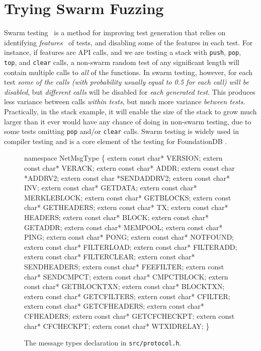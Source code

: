 \section{Trying Swarm Fuzzing}

Swarm testing~\cite{ISSTA12} is a method for improving test
generation that relies on identifying \emph{features}~\cite{groce2013help} of tests, and
disabling some of the features in each test.  For instance, if features are
API calls, and we are testing a stack with {\tt push}, {\tt pop}, {\tt
  top}, and {\tt clear} calls, a non-swarm random test of any
significant length will contain multiple calls to \emph{all} of
the functions.  In swarm testing, however, for each test \emph{some of the calls
(with probability usually equal to 0.5 for each call) will be
disabled}, but \emph{different calls} will be disabled for \emph{each generated
test}.  This produces less variance between calls \emph{within tests}, but
much more variance \emph{between tests}.  Practically, in the stack
example, it will enable the size of the stack to grow much larger than
it ever would have any chance of doing in non-swarm testing, due to
some tests omitting {\tt pop} and/or {\tt clear} calls.  Swarm testing
is widely used in compiler testing
\cite{le2014compiler} and is a core element of the
testing for FoundationDB \cite{zhou2021foundationdb}.

\begin{figure}
{\scriptsize
\begin{code}
namespace NetMsgType \{
  extern const char* VERSION;
  extern const char* VERACK;
  extern const char* ADDR;
  extern const char *ADDRV2;
  extern const char *SENDADDRV2;
  extern const char* INV;
  extern const char* GETDATA;
  extern const char* MERKLEBLOCK;
  extern const char* GETBLOCKS;
  extern const char* GETHEADERS;
  extern const char* TX;
  extern const char* HEADERS;
  extern const char* BLOCK;
  extern const char* GETADDR;
  extern const char* MEMPOOL;
  extern const char* PING;
  extern const char* PONG;
  extern const char* NOTFOUND;
  extern const char* FILTERLOAD;
  extern const char* FILTERADD;
  extern const char* FILTERCLEAR;
  extern const char* SENDHEADERS;
  extern const char* FEEFILTER;
  extern const char* SENDCMPCT;
  extern const char* CMPCTBLOCK;
  extern const char* GETBLOCKTXN;
  extern const char* BLOCKTXN;
  extern const char* GETCFILTERS;
  extern const char* CFILTER;
  extern const char* GETCFHEADERS;
  extern const char* CFHEADERS;
  extern const char* GETCFCHECKPT;
  extern const char* CFCHECKPT;
  extern const char* WTXIDRELAY;
  \}
\end{code}
}
\caption{The message types declaration in {\tt src/protocol.h}.}
\label{types}
\end{figure}

